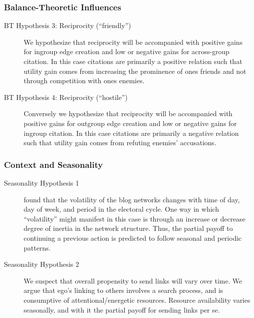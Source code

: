 \documentclass{beamer}
\begin{document}
\begin{frame}
\frametitle{Balance-Theoretic Influences}

\begin{block}{}
\begin{description}

\item[BT Hypothesis 3: Reciprocity (``friendly'')]  We hypothesize that reciprocity will be accompanied with positive gains for ingroup edge creation and low or negative gains for across-group citation. In this case citations are primarily a positive relation such that utility gain comes from increasing the prominence of ones friends and not through competition with ones enemies. 

\item[BT Hypothesis 4: Reciprocity (``hostile'')]  Conversely we hypothesize that reciprocity will be accompanied with positive gains for outgroup edge creation and low or negative gains for ingroup citation. In this case citations are primarily a negative relation such that utility gain comes from refuting enemies' accusations. 
\end{description}

\end{block}

\end{frame}

\begin{frame}
\frametitle{Context and Seasonality}

\begin{block}{}
\begin{description}

\item[Seasonality Hypothesis 1]\cite{butts09} found that the volatility of the blog networks changes with time of day, day of week, and period in the electoral cycle.  One way in which ``volatility'' might manifest in this case is through an increase or decrease degree of inertia in the network structure.  Thus, the partial payoff to continuing a previous action is predicted to follow seasonal and periodic patterns.

\item[Seasonality Hypothesis 2] We suspect that overall propensity to send links will vary over time. We argue that ego's linking to others involves a search process, and is consumptive of attentional/energetic resources. Resource availability varies seasonally, and with it the partial payoff for sending links per se.

\end{description}

\end{block}
\end{frame}
\end{document}
